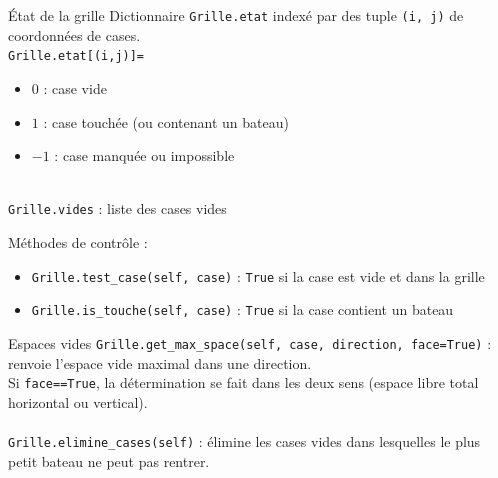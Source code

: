 \begin{frame}{État de la grille}
Dictionnaire \texttt{Grille.etat} indexé par des tuple \texttt{(i, j)} de coordonnées de cases.\\ \pause
\texttt{Grille.etat[(i,j)]=}
\begin{itemize}
\item $0$ : case vide
\item $1$ : case touchée (ou contenant un bateau)
\item $-1$ : case manquée ou impossible
\end{itemize}
~\\ \pause
\texttt{Grille.vides} : liste des cases vides
\end{frame}

\begin{frame}
Méthodes de contrôle :
\begin{itemize}
\item \texttt{Grille.test\_case(self, case)} : \texttt{True} si la case est vide et dans la grille
\item \texttt{Grille.is\_touche(self, case)} : \texttt{True} si la case contient un bateau
\end{itemize}
\end{frame}


\begin{frame}{Espaces vides}
\texttt{Grille.get\_max\_space(self, case, direction, face=True)} : renvoie l'espace vide maximal dans une direction.\\
Si \texttt{face==True}, la détermination se fait dans les deux sens (espace libre total horizontal ou vertical).\\~\\ \pause
\texttt{Grille.elimine\_cases(self)} : élimine les cases vides dans lesquelles le plus petit bateau ne peut pas rentrer.
\end{frame}

